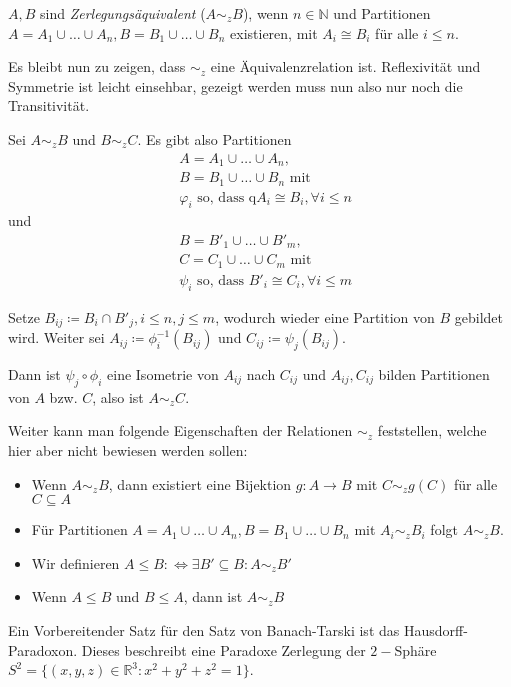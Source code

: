 \begin{definition}[Zerlegungsäquivalenz]
	$A, B$ sind \textit{Zerlegungsäquivalent} ($A\sim_z B$), wenn $n\in\mathbb{N}$ und Partitionen $A=A_1\cup\dots\cup A_n, B=B_1\cup\dots\cup B_n$ existieren, mit $A_i\cong B_i$ für alle $i\leq n$.
\end{definition}

Es bleibt nun zu zeigen, dass $\sim_z$ eine Äquivalenzrelation ist. Reflexivität und Symmetrie ist leicht einsehbar, gezeigt werden muss nun also nur noch die Transitivität.

Sei $A\sim_z B$ und $B\sim_z C$. Es gibt also Partitionen 
\begin{align*}
	&A=A_1\cup\dots\cup A_n,\\
	&B=B_1\cup\dots\cup B_n \text{ mit}\\
	&\varphi_i \text{ so, dass q} A_i\cong B_i, \forall i\leq n
\end{align*}
und 
\begin{align*}
	&B=B'_1\cup\dots\cup B'_m,\\
	&C=C_1\cup\dots\cup C_m \text{ mit}\\
	&\psi_i \text{ so, dass } B'_i\cong C_i, \forall i\leq m
\end{align*}

Setze $B_{ij}\coloneqq B_i\cap B'_j, i\leq n, j\leq m$, wodurch wieder eine Partition von $B$ gebildet wird. Weiter sei $A_{ij}\coloneqq\phi_i^{-1}(B_{ij})$ und $C_{ij}\coloneqq\psi_j(B_{ij})$.

Dann ist $\psi_j\circ\phi_i$ eine Isometrie von $A_{ij}$ nach $C_{ij}$ und $A_{ij}, C_{ij}$ bilden Partitionen von $A$ bzw. $C$, also ist $A\sim_z C$.

Weiter kann man folgende Eigenschaften der Relationen $\sim_z$ feststellen, welche hier aber nicht bewiesen werden sollen:
\begin{itemize}
	\item Wenn $A\sim_z B$, dann existiert eine Bijektion $g:A\to B$ mit $C\sim_z g(C)$ für alle $C\subseteq A$
	\item Für Partitionen $A=A_1\cup\dots\cup A_n, B=B_1\cup\dots\cup B_n$ mit $A_i\sim_z B_i$ folgt $A\sim_z B$.
	\item Wir definieren $A\leq B\colon\Leftrightarrow \exists B'\subseteq B : A\sim_z B'$
	\item Wenn $A\leq B$ und $B\leq A$, dann ist $A\sim_z B$
\end{itemize}

Ein Vorbereitender Satz für den Satz von Banach-Tarski ist das Hausdorff-Paradoxon. Dieses beschreibt eine Paradoxe Zerlegung der $2-$Sphäre $S^2=\{(x,y,z)\in\mathbb{R}^3 : x^2+y^2+z^2=1\}$.


